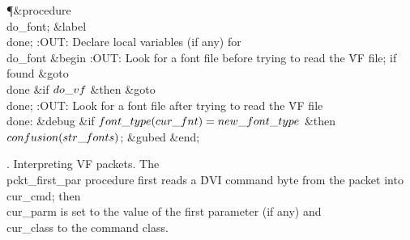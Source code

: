 \Y\P\4\&{procedure}\1\  \\{do\_font};\6
\4\&{label} \\{done};\6
:OUT: Declare local variables (if any) for \\{do\_font}\X\2\6
\&{begin} :OUT: Look for a font file before trying to read the \.{VF}
file; if found \&{goto} \\{done}\X\6
\&{if} $\\{do\_vf}$ \1\&{then}\5
\&{goto} \\{done};\2\6
:OUT: Look for a font file after trying to read the \.{VF} file\X\6
\4\\{done}: \&{debug} \&{if} $\\{font\_type}(\\{cur\_fnt})=\\{new\_font%
\_type}$ \1\&{then}\5
$\\{confusion}(\\{str\_fonts})$;\2\6
\&{gubed}\6
\&{end};\par
\fi

.  Interpreting VF packets.
The \\{pckt\_first\_par} procedure first reads a \.{DVI} command byte from
the packet into \\{cur\_cmd}; then \\{cur\_parm} is set to the value of the
first parameter (if any) and \\{cur\_class} to the command class.

